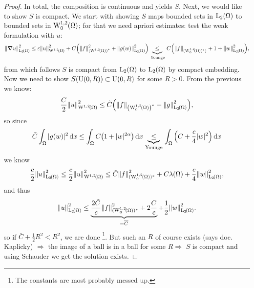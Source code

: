 \documentclass{article}
\begin{document}
\begin{example}
\begin{proof}
In total, the composition is continuous and yields $S$. Next, we would like to show $S$ is compact. We start with showing $S$ maps bounded sets in $\LpSet[2]{\Omega}$ to bounded sets in $\WkpzeroSet[1][2]{\Omega}$; for that we need apriori estimates: test the weak formulation with $u$:
\[
\norm{\grad u}_{\LpSet[2]{\Omega}}^{2} \leq \varepsilon \norm{u}_{\WkpSet[1][2]{\Omega}}^{2} + C\qty(\norm{f}_{\qty(\WkpSet[1][2]{\Omega})^{*}}^{2}+\norm{g(w)}_{\LpSet[2]{\Omega}}^{2}) \underbrace{\leq}_{\, \text{Younge}} \,C\qty(\norm{f}_{(\WkpzeroSet[1][2]{\Omega})^{*})}+1+\norm{w}_{\LpSet[2]{\Omega}}^{2}),
\]
from which follows $S$ is compact from $\LpSet[2]{\Omega}$ to $\LpSet[2]{\Omega}$ by compact embedding. Now we need to show $S\qty(\text{U}(0,R)) \subset \text{U}(0,R)$ for some $R>0.$ From the previous we know:
\[
	\frac{C}{2}\norm{u}_{\WkpSet[1][2]{\Omega}}^{2} \leq \tilde{C}\qty(\norm{f}_{\qty(\WkpzeroSet[1][2]{\Omega})^{*}}+\norm{g}_{\LpSet[2]{\Omega}}^{2}),
\]
so since
\[
	\tilde{C}\int_{\Omega}|g(w)|^{2}\dd{x} \leq \int_{\Omega}C\qty(1+|w|^{2 \alpha})\dd{x} \underbrace{\leq}_{\, \text{Younge} \,} \int_{\Omega}\qty(C+ \frac{c}{4}|w|^{2})\dd{x}
\]
we know
\[
	\frac{c}{2}\norm{u}_{\LpSet[2]{\Omega}}^{2} \leq \frac{c}{2} \norm{u}_{\WkpSet[1][2]{\Omega}}^{2} \leq \tilde{C}\norm{f}_{(\WkpzeroSet[1][2]{\Omega})^{*}}^{2}+C \lambda\qty(\Omega)+ \frac{c}{4}\norm{w}_{\LpSet[2]{\Omega}}^{2},
\]
and thus
\[
	\norm{u}_{\LpSet[2]{\Omega}}^{2} \leq \underbrace{\frac{2 \tilde{C}}{c} \norm{f}_{(\WkpzeroSet[1][2]{\Omega})^{*}}^{2} + 2 \frac{C}{c}}_{=\overline{C}}+\frac{1}{2}\norm{w}_{\LpSet[2]{\Omega}}^{2}.
\]
so if $\overline{C} + \frac{1}{2}R^{2}<R^{2}$, we are done \footnote{The constants are most probably messed up.}. But such an $R$ of course exists (says doc. Kaplicky) $\Rightarrow$ the image of a ball is in a ball for some $R \Rightarrow$ $S$ is compact and using Schauder we get the solution exists.


\end{proof}
\end{example}
\end{document}
